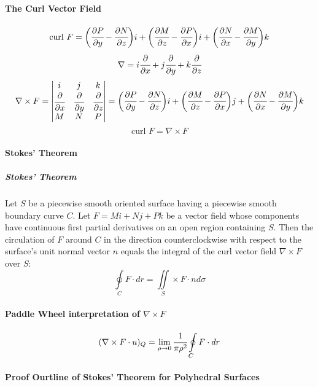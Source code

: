 \documentclass{article}
\begin{document}
            \paragraph{The Curl Vector Field}
                \[\text{curl }F=\bigg(\cfrac{\partial P}{\partial y}-\cfrac{\partial N}{\partial z}\bigg)i+\bigg(\cfrac{\partial M}{\partial z}-\cfrac{\partial P}{\partial x}\bigg)i+\bigg(\cfrac{\partial N}{\partial x}-\cfrac{\partial M}{\partial y}\bigg)k\]
                \[\nabla=i\cfrac{\partial}{\partial x}+j\cfrac{\partial}{\partial y}+k\cfrac{\partial}{\partial z}\]
                \[\nabla\times F=
                \begin{vmatrix}
                    i&j&k\\
                    \cfrac{\partial}{\partial x}&\cfrac{\partial}{\partial y}&\cfrac{\partial}{\partial z}\\
                    M&N&P\\
                \end{vmatrix}
                =\bigg(\cfrac{\partial P}{\partial y}-\cfrac{\partial N}{\partial z}\bigg)i+\bigg(\cfrac{\partial M}{\partial z}-\cfrac{\partial P}{\partial x}\bigg)j+\bigg(\cfrac{\partial N}{\partial x}-\cfrac{\partial M}{\partial y}\bigg)k\]
                \[\text{curl }F=\nabla \times F\]
            \paragraph{Stokes' Theorem}
                \subparagraph{Stokes' Theorem}
                Let $S$ be a piecewise smooth oriented surface having a piecewise smooth boundary curve $C$. Let $F=Mi+Nj+Pk$ be a vector field whose components have continuous first partial derivatives on an open region containing $S$. Then the circulation of $F$ around $C$ in the direction counterclockwise with respect to the surface's unit normal vector $n$ equals the integral of the curl vector field $\nabla \times F$ over $S$:
                \[\oint\limits_CF\cdot dr=\iint\limits_S\times F\cdot nd\sigma\]
            \paragraph{Paddle Wheel interpretation of $\nabla\times F$}
                \[(\nabla\times F\cdot u)_Q=\lim\limits_{\rho\to 0}\cfrac{1}{\pi\rho^2}\oint\limits_CF\cdot dr\]
            \paragraph{Proof Ourtline of Stokes' Theorem for Polyhedral Surfaces}
\end{document}
